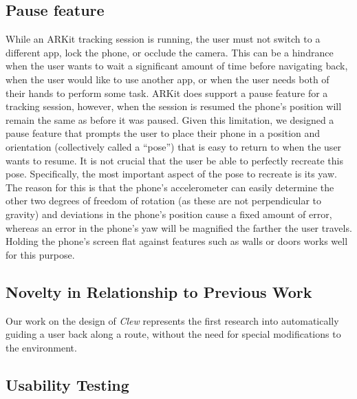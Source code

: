 \documentclass[chi_draft]{sigchi}
\begin{document}
\subsection{Pause feature}
While an ARKit tracking session is running, the user must not switch to a different app, lock the phone, or occlude the camera.  This can be a hindrance when the user wants to wait a significant amount of time before navigating back, when the user would like to use another app, or when the user needs both of their hands to perform some task.  ARKit does support a pause feature for a tracking session, however, when the session is resumed the phone's position will remain the same as before it was paused.  Given this limitation, we designed a pause feature that prompts the user to place their phone in a position and orientation (collectively called a ``pose'') that is easy to return to when the user wants to resume.  It is not crucial that the user be able to perfectly recreate this pose.  Specifically, the most important aspect of the pose to recreate is its yaw.  The reason for this is that the phone's accelerometer can easily determine the other two degrees of freedom of rotation (as these are not perpendicular to gravity) and deviations in the phone's position cause a fixed amount of error, whereas an error in the phone's yaw will be magnified the farther the user travels.  Holding the phone's screen flat against features such as walls or doors works well for this purpose.  

\subsection{Novelty in Relationship to Previous Work}
Our work on the design of \emph{Clew} represents the first research into automatically guiding a user back along a route, without the need for special modifications to the environment.
\subsection{Usability Testing}
\end{document}
